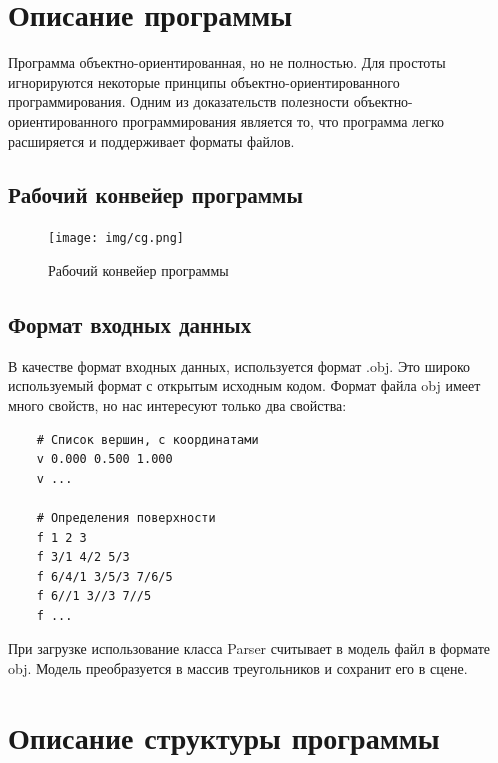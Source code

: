 \section{Описание программы}

Программа объектно-ориентированная, но не полностью.
Для простоты игнорируются некоторые принципы объектно-ориентированного программирования.
Одним из доказательств полезности объектно-ориентированного программирования является то,
что программа легко расширяется и поддерживает форматы файлов.


\subsection*{Рабочий конвейер программы}

\begin{figure}[H]
    \centering
    \texttt{[image: img/cg.png]}
    \caption{Рабочий конвейер программы}
    \label{fig:3.1}
\end{figure}


\subsection*{Формат входных данных}

В качестве формат входных данных, используется формат .obj.
Это широко используемый формат с открытым исходным кодом.
Формат файла obj имеет много свойств, но нас интересуют только два свойства:

\begin{verbatim}
    # Список вершин, с координатами
    v 0.000 0.500 1.000
    v ...

    # Определения поверхности
    f 1 2 3
    f 3/1 4/2 5/3
    f 6/4/1 3/5/3 7/6/5
    f 6//1 3//3 7//5
    f ...
\end{verbatim}

При загрузке использование класса Parser считывает в модель файл в формате obj.
Модель преобразуется в массив треугольников и сохранит его в сцене.


\section{Описание структуры программы}

